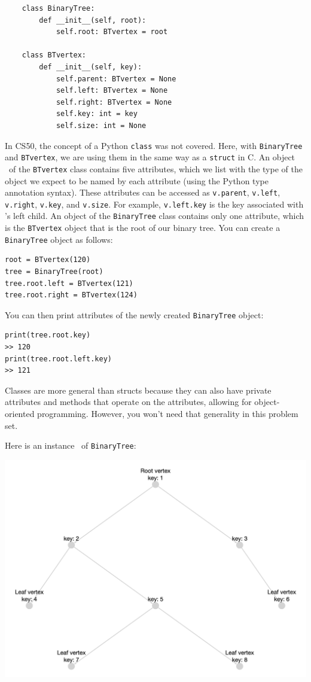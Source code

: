 \documentclass[11pt]{article}
\begin{document}
\begin{enumerate}
 \begin{verbatim}
    class BinaryTree:
        def __init__(self, root):
            self.root: BTvertex = root
 
    class BTvertex:
        def __init__(self, key):
            self.parent: BTvertex = None
            self.left: BTvertex = None
            self.right: BTvertex = None
            self.key: int = key
            self.size: int = None
 \end{verbatim}


 In CS50, the concept of a Python \texttt{class} was not covered. Here, with \texttt{BinaryTree} and \texttt{BTvertex}, we are using them in the same way as a \texttt{struct} in C. An object \btv\ of the \texttt{BTvertex} class contains five attributes, which we list with the type of the object we expect to be named by each attribute (using the Python type annotation syntax). These attributes can be accessed as \texttt{v.parent}, \texttt{v.left}, \texttt{v.right}, \texttt{v.key}, and \texttt{v.size}. 
 For example, \texttt{v.left.key} is the key associated with \btv's left child. An object of the \texttt{BinaryTree} class contains only one attribute, which is the \texttt{BTvertex} object that is the root of our binary tree. You can create a \texttt{BinaryTree} object as follows:
 
\begin{verbatim}
root = BTvertex(120)
tree = BinaryTree(root)
tree.root.left = BTvertex(121)
tree.root.right = BTvertex(124)
\end{verbatim}

You can then print attributes of the newly created \texttt{BinaryTree} object:
\begin{verbatim}
print(tree.root.key)
>> 120
print(tree.root.left.key)
>> 121
\end{verbatim}
 

 Classes are more general than structs because they can also have private attributes and methods that operate on the attributes, allowing for object-oriented programming. However, you won't need that generality in this problem set.

 Here is an instance \treeT\ of \texttt{BinaryTree}:
 
 \includegraphics[scale=.175]{ps0_assets/p0_q1_BT_before.png}


\end{enumerate}
\end{document}
